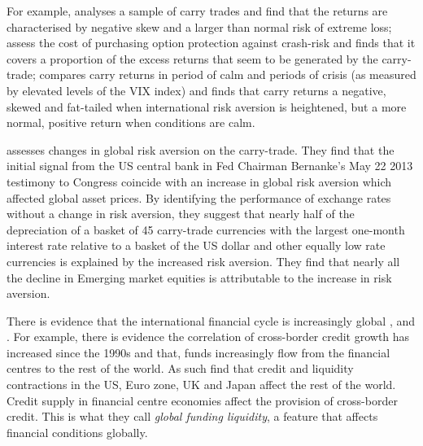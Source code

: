 \documentclass[12pt, a4paper, oneside]{article} %
\begin{document}
For example, \citet{BrunnermeierCarry} analyses a sample of carry trades and find that the returns are characterised by negative skew and a larger than normal risk of extreme loss; \citet{JurekCrash} assess the cost of purchasing option protection against crash-risk and finds that it covers a proportion of the excess returns that seem to be generated by the carry-trade; \citet{Hayward2013} compares carry returns in period of calm and periods of crisis (as measured by elevated levels of the VIX index) and finds that carry returns a negative, skewed and fat-tailed when international risk aversion is heightened, but a more normal, positive return when conditions are calm. 

 
\citet{NYFedtaper} assesses changes in global risk aversion on the carry-trade.  They find that the initial signal from the US central bank in Fed Chairman Bernanke's May 22 2013 testimony to Congress coincide with an increase in global risk aversion which affected global asset prices. %
By identifying the performance of exchange rates without a change in risk aversion, they suggest that nearly half of the depreciation of a basket of 45 carry-trade currencies with the largest one-month interest rate relative to a basket of the US dollar and other equally low rate currencies is explained by the increased risk aversion. They find that nearly all the decline in Emerging market equities is attributable to the increase in risk aversion.

There is evidence that the international financial cycle is increasingly global \citet{Rey2013}, \citet{Obstfeld2014} and \citet{Bruno2014}.  %
For example, there is evidence the correlation of cross-border credit growth has increased since the 1990s and that, funds increasingly flow from the financial centres to the rest of the world. As such \citet{Cerutti2014} find that credit and liquidity contractions in  the US, Euro zone, UK and Japan affect the rest of the world. Credit supply in financial centre economies affect the provision of cross-border credit.  This is what they call \emph{global funding liquidity}, a feature that affects financial conditions globally. 

\end{document}
